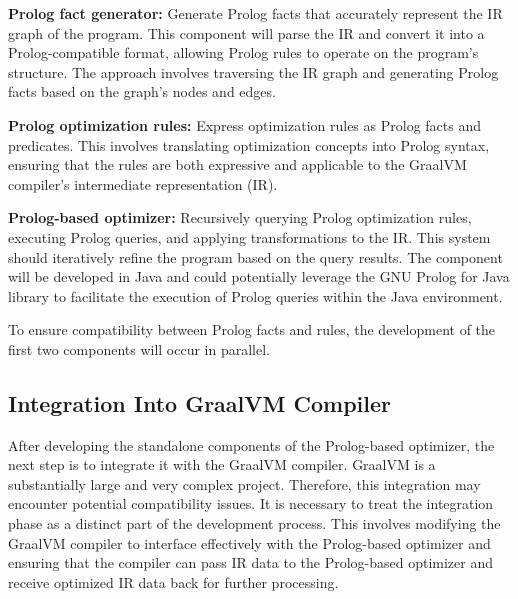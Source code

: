\textbf{Prolog fact generator:} Generate Prolog facts that accurately represent the IR graph of the program. This component will parse the IR and convert it into a Prolog-compatible format, allowing Prolog rules to operate on the program's structure. The approach involves traversing the IR graph and generating Prolog facts based on the graph's nodes and edges.

\textbf{Prolog optimization rules:} Express optimization rules as Prolog facts and predicates. This involves translating optimization concepts into Prolog syntax, ensuring that the rules are both expressive and applicable to the GraalVM compiler's intermediate representation (IR).

\textbf{Prolog-based optimizer:} Recursively querying Prolog optimization rules, executing Prolog queries, and applying transformations to the IR. This system should iteratively refine the program based on the query results. The component will be developed in Java and could potentially leverage the GNU Prolog for Java library to facilitate the execution of Prolog queries within the Java environment. 

To ensure compatibility between Prolog facts and rules, the development of the first two components will occur in parallel.

\subsection{Integration Into GraalVM Compiler}
After developing the standalone components of the Prolog-based optimizer, the next step is to integrate it with the GraalVM compiler. GraalVM is a substantially large and very complex project. Therefore, this integration may encounter potential compatibility issues. It is necessary to treat the integration phase as a distinct part of the development process. This involves modifying the GraalVM compiler to interface effectively with the Prolog-based optimizer and ensuring that the compiler can pass IR data to the Prolog-based optimizer and receive optimized IR data back for further processing.

